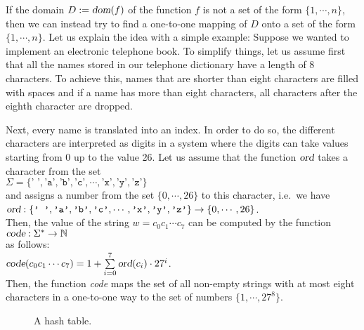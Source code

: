 If the domain $D := \textsl{dom}(f)$ of the function $f$ is not a set of the form $\{1, \cdots, n\}$, 
then we can instead try to find a one-to-one mapping of $D$ onto a set of the form $\{1,\cdots,n\}$.
Let us explain the idea with a simple example:  Suppose we wanted to implement an electronic 
telephone book.
To simplify things, let us assume first that all the names stored in our telephone dictionary
have a length of 8 characters.  To achieve this, names that are shorter than eight characters
are filled with spaces and if a name has more than eight characters, all characters after the
eighth character are dropped.

Next, every name is translated into an index.  In order to do so, the different
characters are interpreted as digits in a system where the digits can take values starting
from 0 up to the value 26.
Let us assume that the function  $\textsl{ord}$ takes a character from the set
\\[0.2cm]
\hspace*{1.3cm}
$\Sigma = \{ \texttt{' '}, \texttt{'a'}, \texttt{'b'}, \texttt{'c'}, \cdots, \texttt{'x'}, \texttt{'y'}, \texttt{'z'} \}$ 
\\[0.2cm]
and assigns a number from the set $\{0,\cdots,26\}$ to this character, i.e.~we have \\[0.2cm]
\hspace*{1.3cm} 
$\textsl{ord}: \{ \texttt{' '}, \texttt{'a'}, \texttt{'b'}, \texttt{'c'}, \cdots, \texttt{'x'}, \texttt{'y'}, \texttt{'z'} \} \rightarrow \{0,\cdots, 26\}$.
\\[0.2cm]
Then, the value of the string  $w = c_0c_1\cdots c_7$ can be computed by the function \\[0.2cm]
\hspace*{1.3cm} 
$\textsl{code}: \Sigma^* \rightarrow \mathbb{N}$ \\[0.2cm]
as follows: \\[0.2cm]
\hspace*{1.3cm} 
$\textsl{code}(c_0c_1\cdots c_7) = 1 + \sum\limits_{i=0}^7 \textsl{ord}(c_i) \cdot 27^i$.
\\[0.2cm]
Then, the function \textsl{code} maps the set of all non-empty strings with at most eight characters in a
one-to-one way to the set of numbers $\{1,\cdots,27^8\}$.


\begin{figure}[!ht]
  \centering
  \caption{A hash table.}
  \label{fig:hash-example}
\end{figure}

